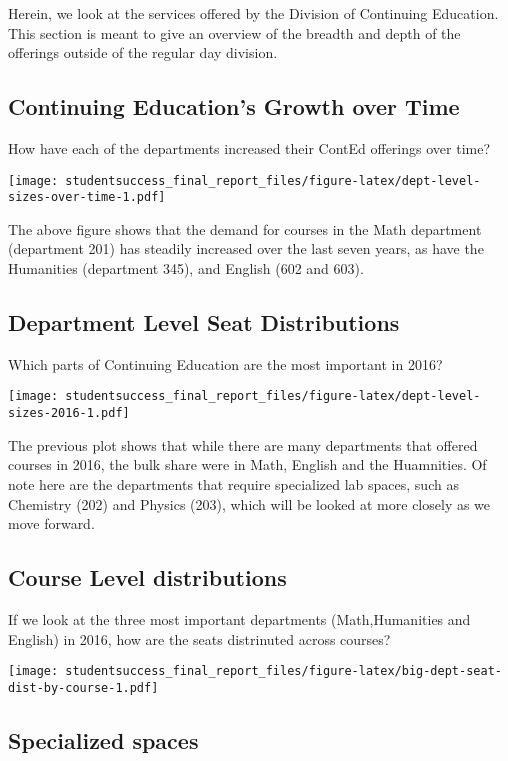 \documentclass[]{book}
\theoremstyle{definition}
\theoremstyle{definition}
\theoremstyle{remark}
\begin{document}
Herein, we look at the services offered by the Division of Continuing
Education. This section is meant to give an overview of the breadth and
depth of the offerings outside of the regular day division.

\subsection{Continuing Education's Growth over
Time}\label{continuing-educations-growth-over-time}

How have each of the departments increased their ContEd offerings over
time?

\texttt{[image: studentsuccess\_final\_report\_files/figure-latex/dept-level-sizes-over-time-1.pdf]}

The above figure shows that the demand for courses in the Math
department (department 201) has steadily increased over the last seven
years, as have the Humanities (department 345), and English (602 and
603).

\subsection{Department Level Seat
Distributions}\label{department-level-seat-distributions}

Which parts of Continuing Education are the most important in 2016?

\texttt{[image: studentsuccess\_final\_report\_files/figure-latex/dept-level-sizes-2016-1.pdf]}

The previous plot shows that while there are many departments that
offered courses in 2016, the bulk share were in Math, English and the
Huamnities. Of note here are the departments that require specialized
lab spaces, such as Chemistry (202) and Physics (203), which will be
looked at more closely as we move forward.

\subsection{Course Level
distributions}\label{course-level-distributions}

If we look at the three most important departments (Math,Humanities and
English) in 2016, how are the seats distrinuted across courses?

\texttt{[image: studentsuccess\_final\_report\_files/figure-latex/big-dept-seat-dist-by-course-1.pdf]}

\subsection{Specialized spaces}\label{specialized-spaces}
\end{document}

